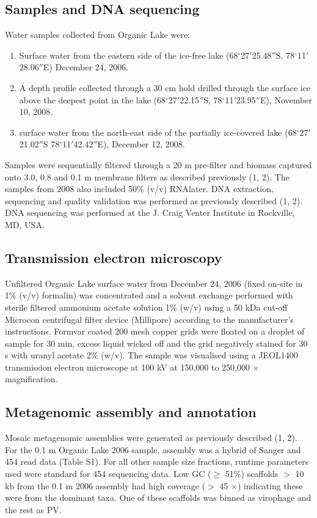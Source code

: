 \subsection{Samples and DNA sequencing}
Water samples collected from Organic Lake were: 

\begin{enumerate}
\item Surface water from the eastern side of the ice-free lake (68$^{\circ}$27$'$25.48$''$S, 78$^{\circ}$11$'$28.06$''$E) December 24, 2006.
\item A depth profile collected through a 30 cm hold drilled through the surface ice above the deepest point in the lake (68$^{\circ}$27$'$22.15$''$S, 78$^{\circ}$11$'$23.95$''$E), November 10, 2008. 
\item surface water from the north-east side of the partially ice-covered lake (68$^{\circ}$27$'$21.02$''$S 78$^{\circ}$11$'$42.42$''$E), December 12, 2008. 
\end{enumerate}

Samples were sequentially filtered through a 20 \textmu{}m pre-filter and biomass captured onto 3.0, 0.8 and 0.1 \textmu{}m membrane filters as described previously (1, 2). 
The samples from 2008 also included 50\% (v/v) \textsc{RNA}later. 
DNA extraction, sequencing and quality validation was performed as previously described (1, 2). 
DNA sequencing was performed at the J. Craig Venter Institute in Rockville, \textsc{MD}, \textsc{USA}.  

\subsection{Transmission electron microscopy}
Unfiltered Organic Lake surface water from December 24, 2006 (fixed on-site in 1\% (v/v) formalin) was concentrated and a solvent exchange performed with sterile filtered ammonium acetate solution 1\% (w/v) using a 50 kDa cut-off Microcon centrifugal filter device (Millipore) according to the manufacturer’s instructions. 
Formvar coated 200 mesh copper grids were floated on a droplet of sample for 30 min, excess liquid wicked off and the grid negatively stained for 30 s with uranyl acetate 2\% (w/v). 
The sample was visualised using a JEOL1400 transmission electron microscope at 100 kV at 150,000 to 250,000 $\times$ magnification.

\subsection{Metagenomic assembly and annotation}
Mosaic metagenomic assemblies were generated as previously described (1, 2). 
For the 0.1 \textmu{}m Organic Lake 2006 sample, assembly was a hybrid of Sanger and 454 read data (Table S1). 
For all other sample size fractions, runtime parameters used were standard for 454 sequencing data. 
Low GC ($\ge$ 51\%) scaffolds $>$ 10 kb from the 0.1 \textmu{}m 2006 assembly had high coverage ($>$ 45 $\times$) indicating these were from the dominant taxa. 
One of these scaffolds was binned as virophage and the rest as \ac{PV}. 

